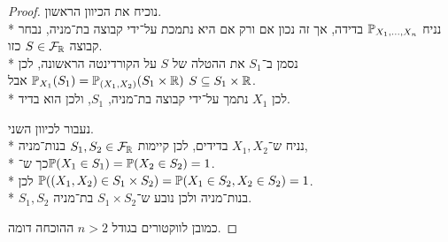 \begin{proof}
	נוכיח את הכיוון הראשון. \\*
	נניח $\mathbb{P}_{X_1, \dots, X_n}$ בדידה, אך זה נכון אם ורק אם היא נתמכת על־ידי קבוצה בת־מניה, נבחר קבוצה $S \in \mathcal{F}_{\mathbb{R}}$ כזו. \\*
	נסמן ב־$S_1$ את ההטלה של $S$ על הקורדינטה הראשונה, לכן $\mathbb{P}_{X_1}(S_1) = \mathbb{P}_{(X_1, X_2)}(S_1 \times \mathbb{R})$ אבל $S \subseteq S_1 \times \mathbb{R}$. \\*
	לכן $X_1$ נתמך על־ידי קבוצה בת־מניה, $S_1$, ולכן הוא בדיד.

	נעבור לכיוון השני. \\*
	נניח ש־$X_1, X_2$ בדידים, לכן קיימות $S_1, S_2 \in \mathcal{F}_{\mathbb{R}}$ בנות־מניה, \\*
	כך ש־$\mathbb{P}(X_1 \in S_1) = \mathbb{P}(X_2 \in S_2) = 1$. \\*
	לכן $\mathbb{P}((X_1, X_2) \in S_1 \times S_2) = \mathbb{P}(X_1 \in S_2, X_2 \in S_2) = 1$. \\*
	$S_1, S_2$ בנות־מניה ולכן נובע ש־$S_1 \times S_2$ בת־מניה.

	כמובן לווקטורים בגודל $n > 2$ ההוכחה דומה.
\end{proof}

\listoftheorems[title=הגדרות ומשפטים,ignoreall,show={theorem,definition},swapnumber]

